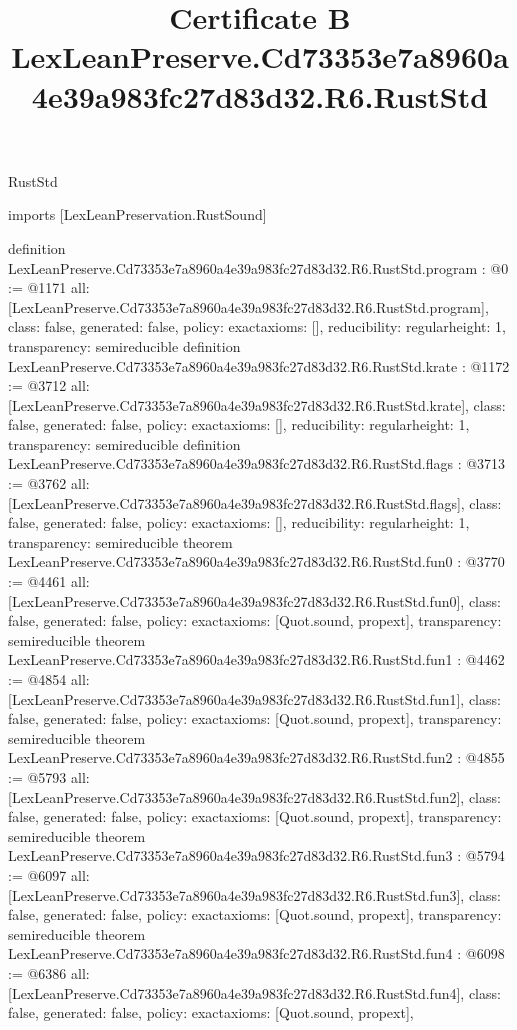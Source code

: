 \begin{lexlean}{RustStd}
\title{Certificate B LexLeanPreserve.Cd73353e7a8960a4e39a983fc27d83d32.R6.RustStd}
\begin{coremodule}
imports [LexLeanPreservation.RustSound]

definition LexLeanPreserve.Cd73353e7a8960a4e39a983fc27d83d32.R6.RustStd.program : @0 := @1171 {
  all: [LexLeanPreserve.Cd73353e7a8960a4e39a983fc27d83d32.R6.RustStd.program],
  class: false,
  generated: false,
  policy: exact{axioms: []},
  reducibility: regular{height: 1},
  transparency: semireducible
}
definition LexLeanPreserve.Cd73353e7a8960a4e39a983fc27d83d32.R6.RustStd.krate : @1172 := @3712 {
  all: [LexLeanPreserve.Cd73353e7a8960a4e39a983fc27d83d32.R6.RustStd.krate],
  class: false,
  generated: false,
  policy: exact{axioms: []},
  reducibility: regular{height: 1},
  transparency: semireducible
}
definition LexLeanPreserve.Cd73353e7a8960a4e39a983fc27d83d32.R6.RustStd.flags : @3713 := @3762 {
  all: [LexLeanPreserve.Cd73353e7a8960a4e39a983fc27d83d32.R6.RustStd.flags],
  class: false,
  generated: false,
  policy: exact{axioms: []},
  reducibility: regular{height: 1},
  transparency: semireducible
}
theorem LexLeanPreserve.Cd73353e7a8960a4e39a983fc27d83d32.R6.RustStd.fun0 : @3770 := @4461 {
  all: [LexLeanPreserve.Cd73353e7a8960a4e39a983fc27d83d32.R6.RustStd.fun0],
  class: false,
  generated: false,
  policy: exact{axioms: [Quot.sound, propext]},
  transparency: semireducible
}
theorem LexLeanPreserve.Cd73353e7a8960a4e39a983fc27d83d32.R6.RustStd.fun1 : @4462 := @4854 {
  all: [LexLeanPreserve.Cd73353e7a8960a4e39a983fc27d83d32.R6.RustStd.fun1],
  class: false,
  generated: false,
  policy: exact{axioms: [Quot.sound, propext]},
  transparency: semireducible
}
theorem LexLeanPreserve.Cd73353e7a8960a4e39a983fc27d83d32.R6.RustStd.fun2 : @4855 := @5793 {
  all: [LexLeanPreserve.Cd73353e7a8960a4e39a983fc27d83d32.R6.RustStd.fun2],
  class: false,
  generated: false,
  policy: exact{axioms: [Quot.sound, propext]},
  transparency: semireducible
}
theorem LexLeanPreserve.Cd73353e7a8960a4e39a983fc27d83d32.R6.RustStd.fun3 : @5794 := @6097 {
  all: [LexLeanPreserve.Cd73353e7a8960a4e39a983fc27d83d32.R6.RustStd.fun3],
  class: false,
  generated: false,
  policy: exact{axioms: [Quot.sound, propext]},
  transparency: semireducible
}
theorem LexLeanPreserve.Cd73353e7a8960a4e39a983fc27d83d32.R6.RustStd.fun4 : @6098 := @6386 {
  all: [LexLeanPreserve.Cd73353e7a8960a4e39a983fc27d83d32.R6.RustStd.fun4],
  class: false,
  generated: false,
  policy: exact{axioms: [Quot.sound, propext]},
}
\end{coremodule}
\end{lexlean}
